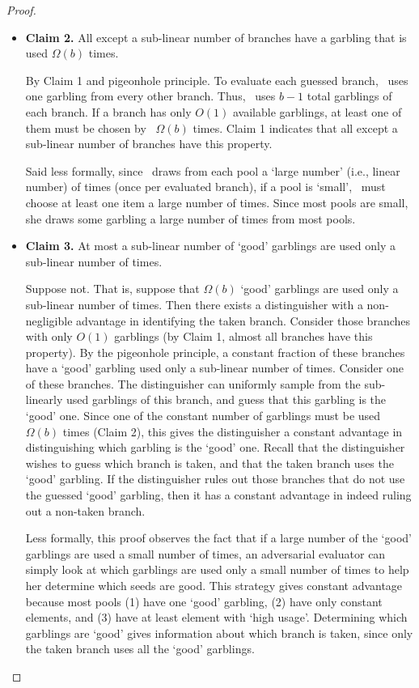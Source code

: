 \begin{proof}
\begin{itemize}
  \item \textbf{Claim 2.}
    All except a sub-linear number of branches have a garbling that is
    used $\Omega(b)$ times.
    \begin{subproof}
      By Claim 1 and pigeonhole principle. To evaluate each guessed
      branch, \Eval\ uses one garbling from every other branch.  Thus,
      \Eval\ uses $b-1$ total garblings of each branch. If a branch
      has only $O(1)$ available garblings, at least one of them must
      be chosen by \Eval\ $\Omega(b)$ times. Claim 1 indicates that all
      except a sub-linear number of branches have this property.

      Said less formally, since \Eval\ draws from each pool a `large number'
      (i.e., linear number) of times (once per evaluated branch),
      if a pool is `small', \Eval\ must choose at least one item  a
      large number of times. Since most pools are small, she draws
      some garbling a large number of times from most pools.
    \end{subproof}

  \item \textbf{Claim 3.} At most a sub-linear number of
`good' garblings are used only a sub-linear number of times.
  \begin{subproof}
    Suppose not.
    That is, suppose that $\Omega(b)$ `good' garblings are used only a
    sub-linear number of times.
    Then there exists a distinguisher with a non-negligible advantage
    in identifying the taken branch.
    Consider those branches with
    only $O(1)$ garblings (by Claim 1, almost all branches have this
    property). By the pigeonhole principle, a constant fraction of
    these branches have a `good' garbling used only a sub-linear
    number of times. Consider one of these branches. The distinguisher
    can uniformly sample from the sub-linearly used garblings of this
    branch, and guess that this garbling is the `good' one. Since one
    of the constant number of garblings must be used $\Omega(b)$ times
    (Claim 2), this gives the distinguisher a constant advantage in
    distinguishing which garbling is the `good' one. Recall that the
    distinguisher wishes to guess which branch is taken, and that the
    taken branch uses the `good' garbling. If the distinguisher rules
    out those branches that do not use the guessed `good' garbling,
    then it has a constant advantage in indeed ruling out a non-taken
    branch.

    Less formally, this proof observes the fact that if a large number
    of the `good' garblings are used a small number of times, an
    adversarial evaluator can simply look at which garblings are used
    only a small number of times to help her determine which seeds are
    good.
    This strategy gives constant advantage because most pools (1) have
    one `good' garbling, (2) have only constant elements, and (3) have
    at least element with `high usage'.
    Determining which garblings are `good' gives information about which
    branch is taken, since only the taken branch uses all the `good'
    garblings.
  \end{subproof}
\end{itemize}


\end{proof}
